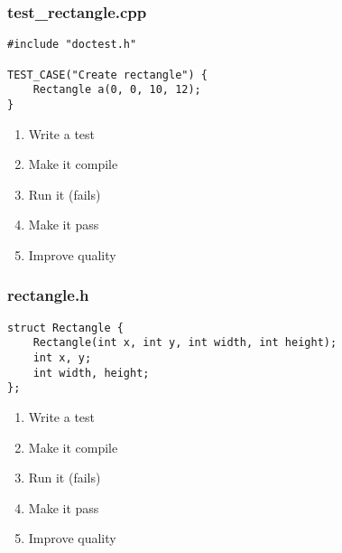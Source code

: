 \begin{frame}[fragile]
\frametitle{test\_rectangle.cpp}
\begin{minipage}[t]{0.48\linewidth}
\begin{lstlisting}
#include "doctest.h"

TEST_CASE("Create rectangle") {
    Rectangle a(0, 0, 10, 12);
}
\end{lstlisting}
\end{minipage}\hfill
\begin{minipage}[t]{0.28\linewidth}
  \small
  \begin{enumerate} 
    \item \textcolor{deadcolor}{Write a test}
    \item \textcolor{activecolor}{Make it compile}
    \item \textcolor{deadcolor}{Run it (fails)}
    \item \textcolor{deadcolor}{Make it pass}
    \item \textcolor{deadcolor}{Improve quality}
  \end{enumerate} 
\end{minipage}
\end{frame}


\begin{frame}[fragile]
\frametitle{rectangle.h}
\begin{minipage}[t]{0.48\linewidth}
\begin{lstlisting}
struct Rectangle {
    Rectangle(int x, int y, int width, int height);
    int x, y;
    int width, height;
};
\end{lstlisting}
\end{minipage}\hfill
\begin{minipage}[t]{0.28\linewidth}
  \small
  \begin{enumerate} 
    \item \textcolor{deadcolor}{Write a test}
    \item \textcolor{activecolor}{Make it compile}
    \item \textcolor{deadcolor}{Run it (fails)}
    \item \textcolor{deadcolor}{Make it pass}
    \item \textcolor{deadcolor}{Improve quality}
  \end{enumerate} 
\end{minipage}
\end{frame}


